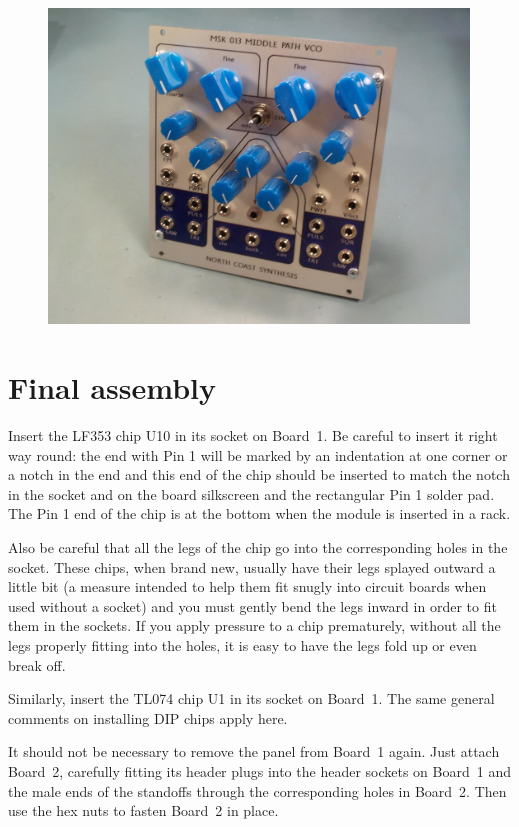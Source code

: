 \begin{figure}[b!]
\noindent\hspace*{\fill}%
\includegraphics[width=4.4in]{module-complete.jpg}%
\hspace*{\fill}\par
\end{figure}
\addtocounter{figure}{-1}

\section{Final assembly}

Insert the LF353 chip U10 in its socket on Board~1.  Be careful to insert it
right way round:  the end with Pin 1 will be marked by an
indentation at one corner or a notch in the end and this end of the chip
should be inserted to match the notch in the socket and on the board
silkscreen and the rectangular Pin 1 solder pad.  The Pin 1 end of the chip
is at the bottom when the module is inserted in a rack.

Also be careful that all the legs of the chip go into the corresponding
holes in the socket.  These chips, when brand new, usually have their legs
splayed outward a little bit (a measure intended to help them fit snugly
into circuit boards when used without a socket) and you must gently bend the
legs inward in order to fit them in the sockets.  If you apply
pressure to a chip prematurely, without all the legs properly fitting into
the holes, it is easy to have the legs fold up or even break off.

Similarly, insert the TL074 chip U1 in its socket on Board~1.  The same
general comments on installing DIP chips apply here.

It should not be necessary to remove the panel from Board~1 again.  Just
attach Board~2, carefully fitting its header plugs into the header sockets
on Board~1 and the male ends of the standoffs through the corresponding
holes in Board~2.  Then use the hex nuts to fasten Board~2 in place.

